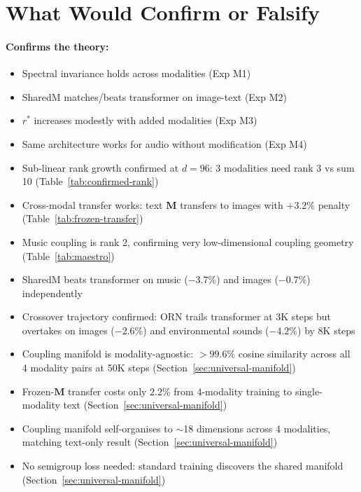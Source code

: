\documentclass[11pt, a4paper]{article}
\newcommand{\M}{\mathbf{M}}
\theoremstyle{plain}
\theoremstyle{remark}
\begin{document}
\section{What Would Confirm or Falsify}

\paragraph{Confirms the theory:}
\begin{itemize}[nosep]
    \item Spectral invariance holds across modalities (Exp M1)
    \item SharedM matches/beats transformer on image-text (Exp M2) \checkmark
    \item $r^*$ increases modestly with added modalities (Exp M3)
    \item Same architecture works for audio without modification (Exp M4)
    \item Sub-linear rank growth confirmed at $d{=}96$: 3 modalities need rank 3 vs sum 10 (Table~\ref{tab:confirmed-rank}) \checkmark
    \item Cross-modal transfer works: text $\M$ transfers to images with $+3.2\%$ penalty (Table~\ref{tab:frozen-transfer}) \checkmark
    \item Music coupling is rank 2, confirming very low-dimensional coupling geometry (Table~\ref{tab:maestro}) \checkmark
    \item SharedM beats transformer on music ($-3.7\%$) and images ($-0.7\%$) independently \checkmark
    \item Crossover trajectory confirmed: ORN trails transformer at 3K steps but overtakes on images ($-2.6\%$) and environmental sounds ($-4.2\%$) by 8K steps \checkmark
    \item Coupling manifold is modality-agnostic: $> 99.6\%$ cosine similarity across all 4 modality pairs at 50K steps (Section~\ref{sec:universal-manifold}) \checkmark
    \item Frozen-$\M$ transfer costs only $2.2\%$ from 4-modality training to single-modality text (Section~\ref{sec:universal-manifold}) \checkmark
    \item Coupling manifold self-organises to $\sim$18 dimensions across 4 modalities, matching text-only result (Section~\ref{sec:universal-manifold}) \checkmark
    \item No semigroup loss needed: standard training discovers the shared manifold (Section~\ref{sec:universal-manifold}) \checkmark
\end{itemize}
\end{document}
